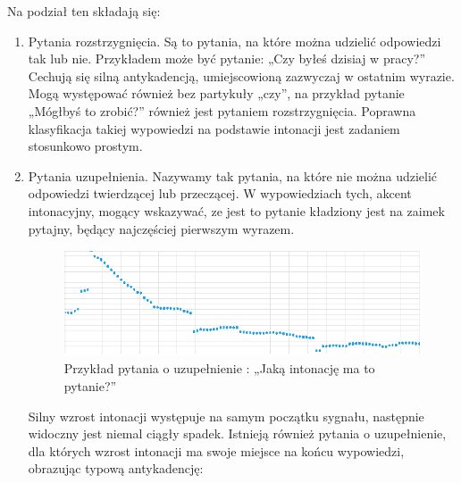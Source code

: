 \documentclass[a4paper,12 pt]{article}
\begin{document}
Na podział ten składają się:
\begin{enumerate}
\item Pytania rozstrzygnięcia. Są to pytania, na które można udzielić odpowiedzi tak lub nie. Przykładem może być pytanie: „Czy byłeś dzisiaj w pracy?”  Cechują się silną antykadencją, umiejscowioną zazwyczaj w ostatnim wyrazie. Mogą występować również bez partykuły „czy”, na przykład pytanie „Mógłbyś to zrobić?” również jest pytaniem rozstrzygnięcia. Poprawna klasyfikacja takiej wypowiedzi na podstawie intonacji jest zadaniem stosunkowo prostym.
\item Pytania uzupełnienia. Nazywamy tak pytania, na które nie można udzielić odpowiedzi twierdzącej lub przeczącej. W wypowiedziach tych, akcent intonacyjny, mogący wskazywać, ze jest to pytanie kładziony jest na zaimek pytajny, będący najczęściej pierwszym wyrazem.

\begin{figure}[h]

\centering
\includegraphics[scale=0.9]{pytanie_uzupelnienie.png}
\caption{Przykład pytania o uzupełnienie : „Jaką intonację ma to pytanie?”}

\end{figure}
\FloatBarrier
Silny wzrost intonacji występuje na samym początku sygnału, następnie widoczny jest niemal ciągły spadek.
Istnieją również pytania o uzupełnienie, dla których wzrost intonacji ma swoje miejsce na końcu wypowiedzi, obrazując typową antykadencję:
 \begin{enumerate}


\end{enumerate}
\end{enumerate}
\end{document}
